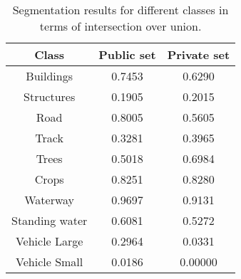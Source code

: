 \documentclass[10pt,twocolumn,letterpaper]{article}
\begin{document}
\begin{table}[h]
	\begin{center}

	\begin{tabular}{c|c|c}
\textbf{Class}    & \textbf{Public set} & \textbf{Private set} \\ \hline \hline
Buildings  & 0.7453 & 0.6290 \\
Structures & 0.1905 & 0.2015 \\
Road  & 0.8005 & 0.5605 \\
Track & 0.3281 & 0.3965 \\
Trees & 0.5018 & 0.6984 \\
Crops & 0.8251 & 0.8280 \\
Waterway & 0.9697 & 0.9131 \\
Standing water & 0.6081 & 0.5272 \\
Vehicle Large & 0.2964 & 0.0331 \\
Vehicle Small & 0.0186 & 0.00000 \\
		\end{tabular}
	\end{center}
	\captionsetup{justification=centering}
	\caption{Segmentation results for different classes in terms of intersection over union.}\label{tab:results}
\end{table}

\newpage
\end{document}
